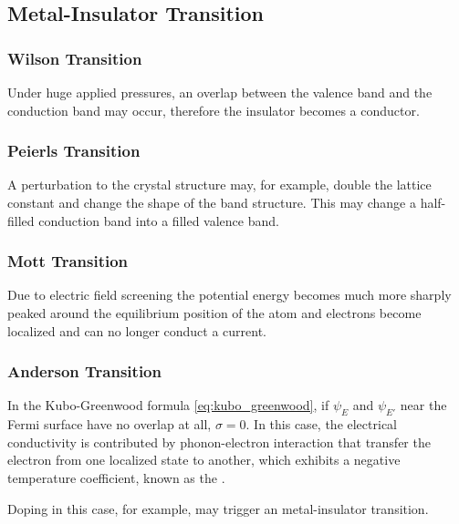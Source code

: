 \documentclass[hidelinks]{article}
\begin{document}


\subsection{Metal-Insulator Transition} %
\label{sub:metal_insulator_transition}

\subsubsection{Wilson Transition} %
\label{ssub:wilson_transition}

Under huge applied pressures, an overlap between the valence band and the conduction band may occur, therefore the insulator becomes a conductor.


\subsubsection{Peierls Transition} %
\label{ssub:peierls_transition}

A perturbation to the crystal structure may, for example, double the lattice constant and change the shape of the band structure. This may change a half-filled conduction band into a filled valence band.


\subsubsection{Mott Transition} %
\label{ssub:mott_transition}

Due to electric field screening the potential energy becomes much more sharply peaked around the equilibrium position of the atom and electrons become localized and can no longer conduct a current.


\subsubsection{Anderson Transition} %
\label{ssub:anderson_transition}

In the Kubo-Greenwood formula \eqref{eq:kubo_greenwood}, if $\psi_E$ and $\psi_{E'}$ near the Fermi surface have no overlap at all, $\sigma = 0$. In this case, the electrical conductivity is contributed by phonon-electron interaction that transfer the electron from one localized state to another, which exhibits a negative temperature coefficient, known as the .
\par
Doping in this case, for example, may trigger an metal-insulator transition.



\end{document}
